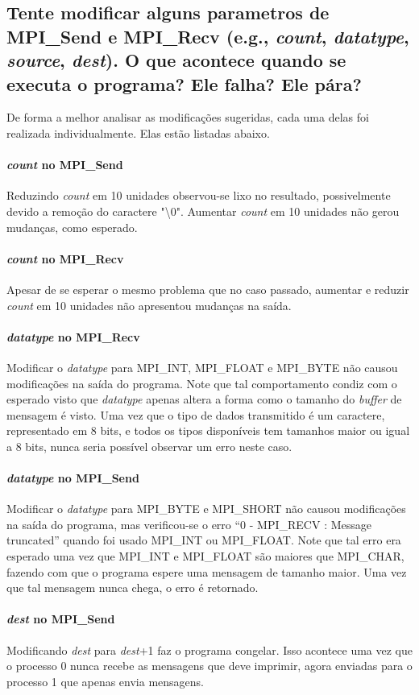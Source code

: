 \documentclass[11pt,a4paper,onecolumn]{article}
\begin{document}
\subsection{Tente modificar alguns parametros de MPI\_Send e MPI\_Recv (e.g., \textit{count}, \textit{datatype}, \textit{source}, \textit{dest}). O que acontece quando se executa o programa? Ele falha? Ele pára?}
De forma a melhor analisar as modificações sugeridas, cada uma delas foi realizada individualmente.
Elas estão listadas abaixo.

\paragraph{\textit{count} no MPI\_Send} Reduzindo \textit{count} em 10 unidades observou-se lixo no resultado, possivelmente devido a remoção do caractere "\textbackslash0". Aumentar \textit{count} em 10 unidades não gerou mudanças, como esperado.
\paragraph{\textit{count} no MPI\_Recv} Apesar de se esperar o mesmo problema que no caso passado, aumentar e reduzir \textit{count} em 10 unidades não apresentou mudanças na saída.
\paragraph{\textit{datatype} no MPI\_Recv} Modificar o \textit{datatype} para MPI\_INT, MPI\_FLOAT e MPI\_BYTE não causou modificações na saída do programa. Note que tal comportamento condiz com o esperado visto que \textit{datatype} apenas altera a forma como o tamanho do \textit{buffer} de mensagem é visto. Uma vez que o tipo de dados transmitido é um caractere, representado em 8 bits, e todos os tipos disponíveis tem tamanhos maior ou igual a 8 bits, nunca seria possível observar um erro neste caso.
\paragraph{\textit{datatype} no MPI\_Send} Modificar o \textit{datatype} para MPI\_BYTE e MPI\_SHORT não causou modificações na saída do programa, mas verificou-se o erro “0 - MPI\_RECV : Message truncated” quando foi usado MPI\_INT ou MPI\_FLOAT. Note que tal erro era esperado uma vez que MPI\_INT e MPI\_FLOAT são maiores que MPI\_CHAR, fazendo com que o programa espere uma mensagem de tamanho maior. Uma vez que tal mensagem nunca chega, o erro é retornado.
\paragraph{\textit{dest} no MPI\_Send} Modificando \textit{dest} para \textit{dest}+1 faz o programa congelar. Isso acontece uma vez que o processo 0 nunca recebe as mensagens que deve imprimir, agora enviadas para o processo 1 que apenas envia mensagens.
\end{document}
